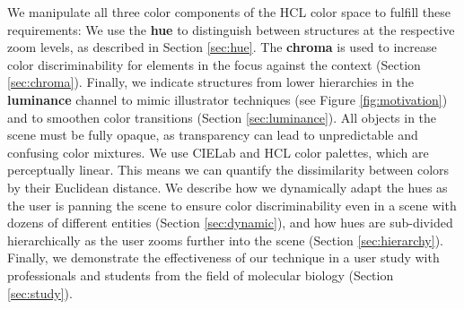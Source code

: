 \documentclass{egpubl}
\begin{document}
	We manipulate all three color components of the HCL color space to fulfill these requirements: 
	We use the \textbf{hue} to distinguish between structures at the respective zoom levels, as described in Section \ref{sec:hue}. 
	The \textbf{chroma} is used to increase color discriminability for elements in the focus against the context (Section \ref{sec:chroma}). 
	Finally, we indicate structures from lower hierarchies in the \textbf{luminance} channel to mimic illustrator techniques (see Figure \ref{fig:motivation}) and to smoothen color transitions (Section \ref{sec:luminance}).
	All objects in the scene must be fully opaque, as transparency can lead to unpredictable and confusing color mixtures. 
	We use CIELab and HCL color palettes, which are perceptually linear. 
	This means we can quantify the dissimilarity between colors by their Euclidean distance.
	We describe how we dynamically adapt the hues as the user is panning the scene to ensure color discriminability even in a scene with dozens of different entities (Section \ref{sec:dynamic}), and how hues are sub-divided hierarchically as the user zooms further into the scene (Section \ref{sec:hierarchy}). 
	Finally, we demonstrate the effectiveness of our technique in a user study with professionals and students from the field of molecular biology (Section \ref{sec:study}). 
	
	
	
\end{document}
